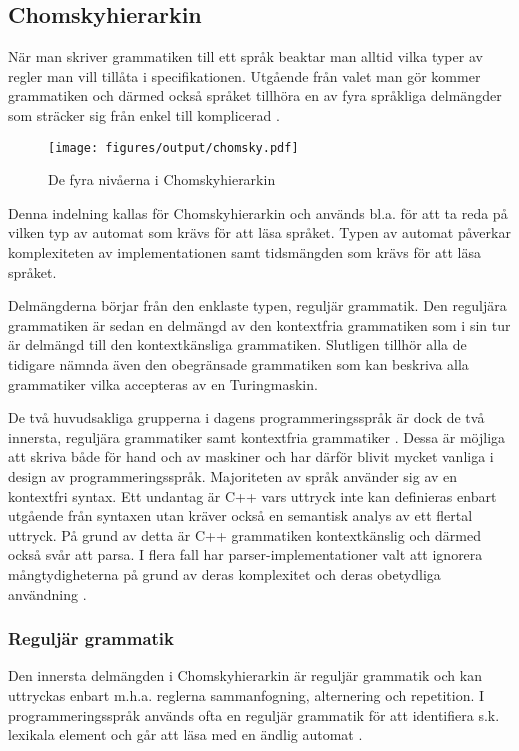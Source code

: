 \subsection{Chomskyhierarkin}

När man skriver grammatiken till ett språk beaktar man alltid vilka
typer av regler man vill tillåta i specifikationen. Utgående från valet man
gör kommer grammatiken och därmed också språket tillhöra en av fyra språkliga
delmängder som sträcker sig från enkel till komplicerad \citep[s. 19]{gd08}.

\begin{figure}[ht]
  \texttt{[image: figures/output/chomsky.pdf]}
  \caption{De fyra nivåerna i Chomskyhierarkin}
\end{figure}

Denna indelning kallas för Chomskyhierarkin och används bl.a. för att ta reda
på vilken typ av automat som krävs för att läsa språket. Typen av automat
påverkar komplexiteten av implementationen samt tidsmängden som krävs för att
läsa språket.

Delmängderna börjar från den enklaste typen, reguljär grammatik. Den
reguljära grammatiken är sedan en delmängd av den kontextfria grammatiken som i
sin tur är delmängd till den kontextkänsliga grammatiken. Slutligen tillhör
alla de tidigare nämnda även den obegränsade grammatiken som kan
beskriva alla grammatiker vilka accepteras av en Turingmaskin.

De två huvudsakliga grupperna i dagens programmeringsspråk är dock de två
innersta, reguljära grammatiker samt kontextfria grammatiker \citep[s.
100]{sm09}. Dessa är möjliga att skriva både för hand och av maskiner och har
därför blivit mycket vanliga i design av programmeringsspråk. Majoriteten av
språk använder sig av en kontextfri syntax. Ett undantag är C++ vars
uttryck inte kan definieras enbart utgående från syntaxen utan kräver också en
semantisk analys av ett flertal uttryck. På grund av detta är C++ grammatiken
kontextkänslig och därmed också svår att parsa. I flera fall har
parser-implementationer valt att ignorera mångtydigheterna på grund av deras
komplexitet och deras obetydliga användning \citep[s. 2]{rt05}.

\subsubsection{Reguljär grammatik}

Den innersta delmängden i Chomskyhierarkin är reguljär grammatik och kan uttryckas
enbart m.h.a. reglerna sammanfogning, alternering och repetition. I
programmeringsspråk används ofta en reguljär grammatik för att identifiera
s.k. lexikala element och går att läsa med en ändlig automat \citep[s.
100]{sm09}.

